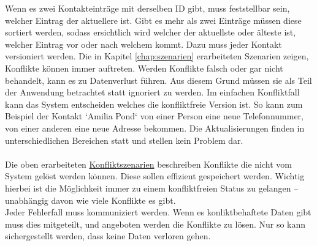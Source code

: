 Wenn es zwei Kontakteinträge mit derselben ID gibt, muss feststellbar sein, welcher Eintrag der aktuellere ist. Gibt es mehr als zwei Einträge müssen diese sortiert werden, sodass ersichtlich wird welcher der aktuellste oder älteste ist, welcher Eintrag vor oder nach welchem kommt. Dazu muss jeder Kontakt versioniert werden.
%
%
%
Die in Kapitel \ref{chap:szenarien} erarbeiteten Szenarien zeigen, Konflikte können immer auftreten. Werden Konflikte falsch oder gar nicht behandelt, kann es zu Datenverlust führen.
Aus diesem Grund müssen sie als Teil der Anwendung betrachtet statt ignoriert zu werden.
Im einfachen Konfliktfall kann das System entscheiden welches die konfliktfreie Version ist. So kann zum Beispiel der Kontakt `Amilia Pond` von einer Person eine neue Telefonnummer, von einer anderen eine neue Adresse bekommen.
Die Aktualisierungen finden in unterschiedlichen Bereichen statt und stellen kein Problem dar. \\\\
Die oben erarbeiteten \hyperref[sec:konfliktszenarien]{Konfliktszenarien} beschreiben Konflikte die nicht vom System gelöst werden können.
Diese sollen effizient gespeichert werden. Wichtig hierbei ist die Möglichkeit immer zu einem konfliktfreien Status zu gelangen -- unabhängig davon wie viele Konflikte es gibt.\\
Jeder Fehlerfall muss kommuniziert werden. Wenn es konliktbehaftete Daten gibt muss dies mitgeteilt, und angeboten werden die Konflikte zu lösen. Nur so kann sichergestellt werden, dass keine Daten verloren gehen.
%
%
